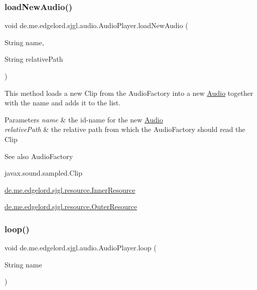 \subsubsection{\texorpdfstring{load\+New\+Audio()}{loadNewAudio()}}
{\footnotesize\ttfamily void de.\+me.\+edgelord.\+sjgl.\+audio.\+Audio\+Player.\+load\+New\+Audio (\begin{DoxyParamCaption}\item[{String}]{name,  }\item[{String}]{relative\+Path }\end{DoxyParamCaption})}

This method loads a new {\ttfamily Clip} from the {\ttfamily Audio\+Factory} into a new {\ttfamily \mbox{\hyperlink{classde_1_1me_1_1edgelord_1_1sjgl_1_1audio_1_1_audio}{Audio}}} together with the name and adds it to the list.


\begin{DoxyParams}{Parameters}
{\em name} & the id-\/name for the new {\ttfamily \mbox{\hyperlink{classde_1_1me_1_1edgelord_1_1sjgl_1_1audio_1_1_audio}{Audio}}} \\
\hline
{\em relative\+Path} & the relative path from which the {\ttfamily Audio\+Factory} should read the {\ttfamily Clip}\\
\hline
\end{DoxyParams}
\begin{DoxySeeAlso}{See also}
Audio\+Factory 

javax.\+sound.\+sampled.\+Clip 

\mbox{\hyperlink{classde_1_1me_1_1edgelord_1_1sjgl_1_1resource_1_1_inner_resource}{de.\+me.\+edgelord.\+sjgl.\+resource.\+Inner\+Resource}} 

\mbox{\hyperlink{classde_1_1me_1_1edgelord_1_1sjgl_1_1resource_1_1_outer_resource}{de.\+me.\+edgelord.\+sjgl.\+resource.\+Outer\+Resource}} 
\end{DoxySeeAlso}
\mbox{\label{classde_1_1me_1_1edgelord_1_1sjgl_1_1audio_1_1_audio_player_a4773c3bc2054fcb5f7892ebf330c68b8}} 
\subsubsection{\texorpdfstring{loop()}{loop()}}
{\footnotesize\ttfamily void de.\+me.\+edgelord.\+sjgl.\+audio.\+Audio\+Player.\+loop (\begin{DoxyParamCaption}\item[{String}]{name }\end{DoxyParamCaption})}

